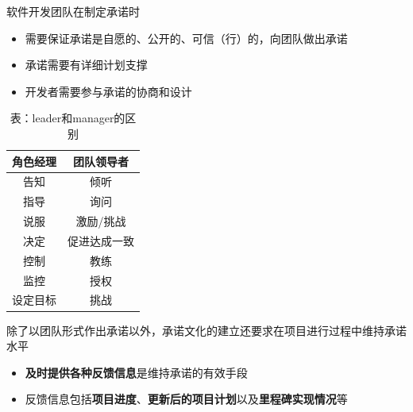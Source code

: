 软件开发团队在制定承诺时
\vspace{-0.8em}
\begin{multicols}{2}
    \begin{itemize}
        \item 需要保证承诺是自愿的、公开的、可信（行）的，向团队做出承诺
        \item 承诺需要有详细计划支撑
        \item 开发者需要参与承诺的协商和设计
    \end{itemize}
\end{multicols}
\vspace{-1em}

\begin{table}
    \centering
    \vspace{-1.5em}
    \begin{tabular}{|c|c|}
        \hline
        \textbf{角色经理} & \textbf{团队领导者} \\ \hline
        告知            & 倾听             \\ \hline
        指导            & 询问             \\ \hline
        说服            & 激励/挑战          \\ \hline
        决定            & 促进达成一致         \\ \hline
        控制            & 教练             \\ \hline
        监控            & 授权             \\ \hline
        设定目标          & 挑战             \\ \hline
    \end{tabular}
    \caption*{表：leader和manager的区别}
    \vspace{-1.5em}
\end{table}
除了以团队形式作出承诺以外，承诺文化的建立还要求在项目进行过程中维持承诺水平
\begin{itemize}
    \item \textbf{及时提供各种反馈信息}是维持承诺的有效手段
    \item 反馈信息包括\textbf{项目进度}、\textbf{更新后的项目计划}以及\textbf{里程碑实现情况}等
\end{itemize}

